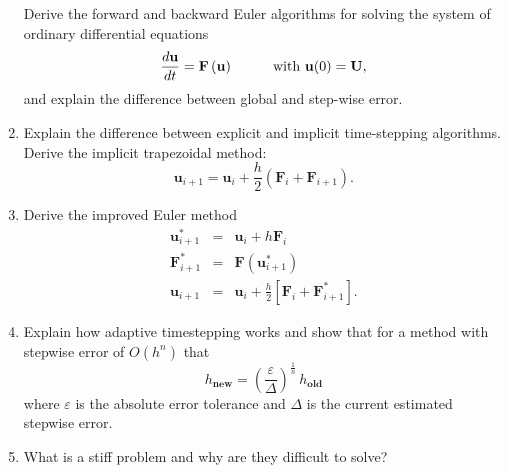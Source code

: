 \documentclass[11pt]{article}
\begin{document}
\begin{multicols}{2}
\begin{enumerate}
Derive the forward and backward Euler algorithms for solving the system of ordinary differential equations
\begin{displaymath}
\frac{d \mathbf{u}}{d t} = \mathbf{F}\left(\mathbf{u}\right) \hspace{1.0cm} \mbox{with $\mathbf{u}(0)=\mathbf{U}$},
\end{displaymath}
and explain the difference between global and step-wise error.
\item
Explain the difference between explicit and implicit time-stepping algorithms. Derive the implicit trapezoidal method:
\begin{displaymath}
\mathbf{u}_{i+1} = \mathbf{u}_i + \frac{h}{2}(\mathbf{F}_i + \mathbf{F}_{i+1}).
\end{displaymath}
\item
Derive the improved Euler method
\begin{eqnarray*}
\mathbf{u}^*_{i+1} &=& \mathbf{u}_i + h \mathbf{F}_i\\
\mathbf{F}^*_{i+1} &=& \mathbf{F}(\mathbf{u}^*_{i+1})\\
\mathbf{u}_{i+1} &=& \mathbf{u}_i + \frac{h}{2}\left[\mathbf{F}_i + \mathbf{F}^*_{i+1} \right].
\end{eqnarray*}
\item
Explain how adaptive timestepping works and show that for a method with stepwise error of $O(h^n)$ that
\begin{displaymath}
h_\mathbf{new} = \left(\frac{\varepsilon}{\Delta}\right)^\frac{1}{n} \,h_\mathbf{old}
\end{displaymath}
where $\varepsilon$ is the absolute error tolerance and $\Delta$ is the current estimated stepwise error.
\item
What is a stiff problem and why are they difficult to solve?

\end{enumerate}

\end{multicols}
\end{document}
